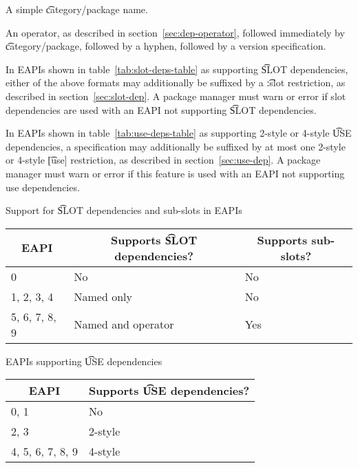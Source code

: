\begin{compactitem}
\item A simple \t{category/package} name.
\item An operator, as described in section~\ref{sec:dep-operator}, followed immediately by
    \t{category/package}, followed by a hyphen, followed by a version specification.
\end{compactitem}

In EAPIs shown in table~\ref{tab:slot-deps-table} as supporting \t{SLOT} dependencies, either of the
above formats may additionally be suffixed by a \t{:slot} restriction, as described in
section~\ref{sec:slot-dep}. A package manager must warn or error if slot dependencies are used with
an EAPI not supporting \t{SLOT} dependencies.

 In EAPIs shown in table~\ref{tab:use-deps-table} as supporting 2-style
or 4-style \t{USE} dependencies, a specification may additionally be suffixed by at most one
2-style or 4-style \t{[use]} restriction, as described in section~\ref{sec:use-dep}. A package
manager must warn or error if this feature is used with an EAPI not supporting use dependencies.


\begin{centertable}{Support for \t{SLOT} dependencies and sub-slots in EAPIs}
    \label{tab:slot-deps-table}
    \begin{tabular}{lll}
      \toprule
      \multicolumn{1}{c}{\textbf{EAPI}} &
      \multicolumn{1}{c}{\textbf{Supports \t{SLOT} dependencies?}} &
      \multicolumn{1}{c}{\textbf{Supports sub-slots?}} \\
      \midrule
      0                 & No                 & No  \\
      1, 2, 3, 4        & Named only         & No  \\
      5, 6, 7, 8, 9     & Named and operator & Yes \\
      \bottomrule
    \end{tabular}
\end{centertable}

\begin{centertable}{EAPIs supporting \t{USE} dependencies}
    \label{tab:use-deps-table}
    \begin{tabular}{ll}
      \toprule
      \multicolumn{1}{c}{\textbf{EAPI}} &
      \multicolumn{1}{c}{\textbf{Supports \t{USE} dependencies?}} \\
      \midrule
      0, 1              & No      \\
      2, 3              & 2-style \\
      4, 5, 6, 7, 8, 9  & 4-style \\
      \bottomrule
    \end{tabular}
\end{centertable}

